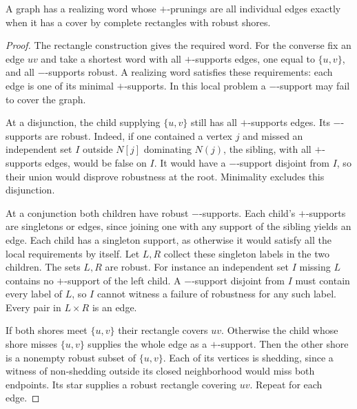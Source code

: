 \begin{theorem}
\label{core:thm:edge-support-realization}
A graph has a realizing word whose $+$-prunings are all individual
edges exactly when it has a cover by complete rectangles with
robust shores.
\end{theorem}
\begin{proof}
The rectangle construction gives the required word. For the converse
fix an edge $uv$ and take a shortest word with all $+$-supports edges,
one equal to $\{u,v\}$, and all $-$-supports robust. A realizing word
satisfies these requirements: each edge is one of its minimal
$+$-supports. In this local problem a $-$-support may fail to
cover the graph.

At a disjunction, the child supplying $\{u,v\}$ still has all
$+$-supports edges. Its $-$-supports are robust. Indeed, if one
contained a vertex $j$ and missed an independent set $I$ outside
$N[j]$ dominating $N(j)$, the sibling, with all $+$-supports edges,
would be false on $I$. It would have a $-$-support disjoint from
$I$, so their union would disprove robustness at the root.
Minimality excludes this disjunction.

At a conjunction both children have robust $-$-supports. Each
child's $+$-supports are singletons or edges, since joining one
with any support of the sibling yields an edge. Each child has
a singleton support, as otherwise it would satisfy all the local
requirements by itself. Let $L,R$ collect these singleton labels
in the two children. The sets $L,R$ are robust. For instance an
independent set $I$ missing $L$ contains no $+$-support of the
left child. A $-$-support disjoint from $I$ must contain every
label of $L$, so $I$ cannot witness a failure of robustness for
any such label. Every pair in $L\times R$ is an edge.

If both shores meet $\{u,v\}$ their rectangle covers $uv$.
Otherwise the child whose shore misses $\{u,v\}$ supplies the
whole edge as a $+$-support. Then the other shore is a nonempty
robust subset of $\{u,v\}$. Each of its vertices is shedding,
since a witness of non-shedding outside its closed neighborhood
would miss both endpoints. Its star supplies a robust rectangle
covering $uv$. Repeat for each edge.
\end{proof}

